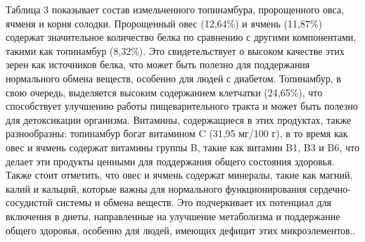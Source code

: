 \begin{multicols}{2}
Таблица 3 показывает состав измельченного топинамбура, пророщенного
овса, ячменя и корня солодки. Пророщенный овес (12,64\%) и ячмень
(11,87\%) содержат значительное количество белка по сравнению с другими
компонентами, такими как топинамбур (8,32\%). Это свидетельствует о
высоком качестве этих зерен как источников белка, что может быть полезно
для поддержания нормального обмена веществ, особенно для людей с
диабетом. Топинамбур, в свою очередь, выделяется высоким содержанием
клетчатки (24,65\%), что способствует улучшению работы пищеварительного
тракта и может быть полезно для детоксикации организма. Витамины,
содержащиеся в этих продуктах, также разнообразны: топинамбур богат
витамином C (31,95 мг/100 г), в то время как овес и ячмень содержат
витамины группы B, такие как витамин B1, B3 и B6, что делает эти
продукты ценными для поддержания общего состояния здоровья. Также стоит
отметить, что овес и ячмень содержат минералы, такие как магний, калий и
кальций, которые важны для нормального функционирования
сердечно-сосудистой системы и обмена веществ. Это подчеркивает их
потенциал для включения в диеты, направленные на улучшение метаболизма и
поддержание общего здоровья, особенно для людей, имеющих дефицит этих
микроэлементов..
\end{multicols}

